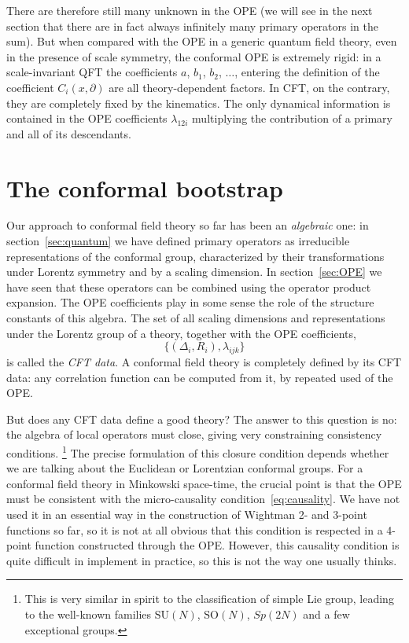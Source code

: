 \documentclass[a4paper,12pt]{article}
\numberwithin{equation}{section}
\begin{document}
There are therefore still many unknown in the OPE (we will see in the next section that there are in fact always infinitely many primary operators in the sum). But when compared with the OPE in a generic quantum field theory, even in the presence of scale symmetry, the conformal OPE is extremely rigid: in a scale-invariant QFT the coefficients $a$, $b_1$, $b_2$, $\ldots$, entering the definition of the coefficient $C_i(x, \partial)$ are all theory-dependent factors. In CFT, on the contrary, they are completely fixed by the kinematics. The only dynamical information is contained in the OPE coefficients $\lambda_{12i}$ multiplying the contribution of a primary and all of its descendants.



\section{The conformal bootstrap}
\label{sec:bootstrap}

Our approach to conformal field theory so far has been an \emph{algebraic} one:
in section~\ref{sec:quantum} we have defined primary operators as irreducible representations of the conformal group, characterized by their transformations under Lorentz symmetry and by a scaling dimension.
In section~\ref{sec:OPE} we have seen that these operators can be combined using the operator product expansion. The OPE coefficients play in some sense the role of the structure constants of this algebra.
The set of all scaling dimensions and representations under the Lorentz group of a theory, together with the OPE coefficients,
\begin{equation}
	\big\{ (\Delta_i, R_i), \lambda_{ijk} \big\}
	\label{eq:CFTdata}
\end{equation}
is called the \emph{CFT data}. A conformal field theory is completely defined by its CFT data: any correlation function can be computed from it, by repeated used of the OPE.

But does any CFT data define a good theory?
The answer to this question is no: the algebra of local operators must close, giving very constraining consistency conditions.%
%
\footnote{This is very similar in spirit to the classification of simple Lie group, leading to the well-known families $\text{SU}(N)$, $\text{SO}(N)$, $Sp(2N)$ and a few exceptional groups.}
%
The precise formulation of this closure condition depends whether we are talking about the Euclidean or Lorentzian conformal groups.
For a conformal field theory in Minkowski space-time, the crucial point is that the OPE must be consistent with the micro-causality condition~\eqref{eq:causality}. We have not used it in an essential way in the construction of Wightman 2- and 3-point functions so far, so it is not at all obvious that this condition is respected in a 4-point function constructed through the OPE. However, this causality condition is quite difficult in implement in practice, so this is not the way one usually thinks.
\end{document}

